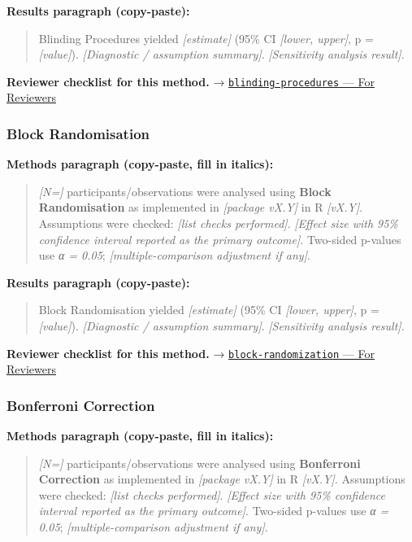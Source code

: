 \documentclass[
]{article}
\begin{document}
\textbf{Results paragraph (copy-paste):}

\begin{quote}
Blinding Procedures yielded \emph{{[}estimate{]}} (95\% CI
\emph{{[}lower, upper{]}}, p = \emph{{[}value{]}}). \emph{{[}Diagnostic
/ assumption summary{]}}. \emph{{[}Sensitivity analysis result{]}}.
\end{quote}

\textbf{Reviewer checklist for this method.} →
\href{../chapters/14-clinical/blinding-procedures.Rmd\#for-reviewers}{\texttt{blinding-procedures}
--- For Reviewers}

\subsubsection{Block Randomisation}\label{block-randomisation}

\textbf{Methods paragraph (copy-paste, fill in italics):}

\begin{quote}
\emph{{[}N={]}} participants/observations were analysed using
\textbf{Block Randomisation} as implemented in \emph{{[}package vX.Y{]}}
in R \emph{{[}vX.Y{]}}. Assumptions were checked: \emph{{[}list checks
performed{]}}. \emph{{[}Effect size with 95\% confidence interval
reported as the primary outcome{]}}. Two-sided p-values use \emph{α =
0.05}; \emph{{[}multiple-comparison adjustment if any{]}}.
\end{quote}

\textbf{Results paragraph (copy-paste):}

\begin{quote}
Block Randomisation yielded \emph{{[}estimate{]}} (95\% CI
\emph{{[}lower, upper{]}}, p = \emph{{[}value{]}}). \emph{{[}Diagnostic
/ assumption summary{]}}. \emph{{[}Sensitivity analysis result{]}}.
\end{quote}

\textbf{Reviewer checklist for this method.} →
\href{../chapters/14-clinical/block-randomization.Rmd\#for-reviewers}{\texttt{block-randomization}
--- For Reviewers}

\subsubsection{Bonferroni Correction}\label{bonferroni-correction}

\textbf{Methods paragraph (copy-paste, fill in italics):}

\begin{quote}
\emph{{[}N={]}} participants/observations were analysed using
\textbf{Bonferroni Correction} as implemented in \emph{{[}package
vX.Y{]}} in R \emph{{[}vX.Y{]}}. Assumptions were checked: \emph{{[}list
checks performed{]}}. \emph{{[}Effect size with 95\% confidence interval
reported as the primary outcome{]}}. Two-sided p-values use \emph{α =
0.05}; \emph{{[}multiple-comparison adjustment if any{]}}.
\end{quote}
\end{document}
